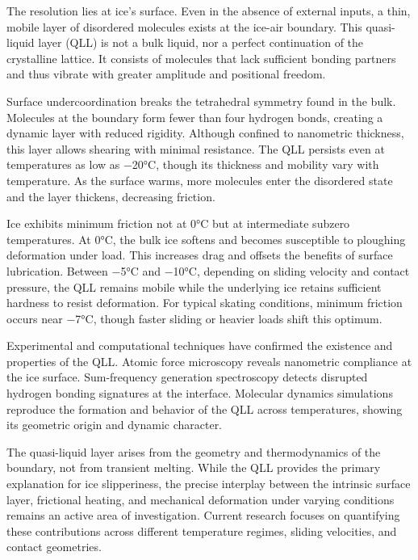 The resolution lies at ice's surface. Even in the absence of external inputs, a thin, mobile layer of disordered molecules exists at the ice-air boundary. This quasi-liquid layer (QLL) is not a bulk liquid, nor a perfect continuation of the crystalline lattice. It consists of molecules that lack sufficient bonding partners and thus vibrate with greater amplitude and positional freedom.

Surface undercoordination breaks the tetrahedral symmetry found in the bulk. Molecules at the boundary form fewer than four hydrogen bonds, creating a dynamic layer with reduced rigidity. Although confined to nanometric thickness, this layer allows shearing with minimal resistance. The QLL persists even at temperatures as low as −20°C, though its thickness and mobility vary with temperature. As the surface warms, more molecules enter the disordered state and the layer thickens, decreasing friction.

Ice exhibits minimum friction not at 0°C but at intermediate subzero temperatures. At 0°C, the bulk ice softens and becomes susceptible to ploughing deformation under load. This increases drag and offsets the benefits of surface lubrication. Between −5°C and −10°C, depending on sliding velocity and contact pressure, the QLL remains mobile while the underlying ice retains sufficient hardness to resist deformation. For typical skating conditions, minimum friction occurs near −7°C, though faster sliding or heavier loads shift this optimum.

Experimental and computational techniques have confirmed the existence and properties of the QLL. Atomic force microscopy reveals nanometric compliance at the ice surface. Sum-frequency generation spectroscopy detects disrupted hydrogen bonding signatures at the interface. Molecular dynamics simulations reproduce the formation and behavior of the QLL across temperatures, showing its geometric origin and dynamic character.

The quasi-liquid layer arises from the geometry and thermodynamics of the boundary, not from transient melting. While the QLL provides the primary explanation for ice slipperiness, the precise interplay between the intrinsic surface layer, frictional heating, and mechanical deformation under varying conditions remains an active area of investigation. Current research focuses on quantifying these contributions across different temperature regimes, sliding velocities, and contact geometries.

